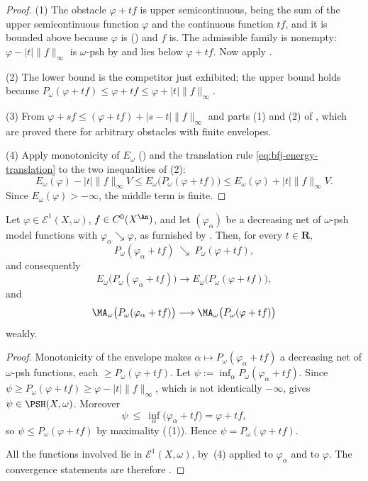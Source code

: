 \begin{proof}
(1) The obstacle \(\varphi+tf\) is upper semicontinuous, being the sum of the
upper semicontinuous function \(\varphi\) and the continuous function
\(tf\), and it is bounded above because \(\varphi\) is
() and \(f\) is.  The admissible family is nonempty:
\(\varphi-|t|\lVert f\rVert_\infty\) is \(\omega\)-psh by
 and lies below \(\varphi+tf\).  Now
apply .

(2) The lower bound is the competitor just exhibited; the upper bound holds
because \(P_\omega(\varphi+tf)\leq\varphi+tf\leq\varphi+|t|\lVert
f\rVert_\infty\).

(3) From \(\varphi+sf\leq(\varphi+tf)+|s-t|\lVert f\rVert_\infty\) and parts
(1) and (2) of , which are proved
there for arbitrary obstacles with finite envelopes.

(4) Apply monotonicity of \(E_\omega\) () and
the translation rule \eqref{eq:bfj-energy-translation} to the two
inequalities of (2):
\[
 E_\omega(\varphi)-|t|\lVert f\rVert_\infty V
 \leq E_\omega\bigl(P_\omega(\varphi+tf)\bigr)
 \leq E_\omega(\varphi)+|t|\lVert f\rVert_\infty V .
\]
Since \(E_\omega(\varphi)>-\infty\), the middle term is finite.
\end{proof}

\begin{lemma}
\label{lem:ch27-e1-envelope-approximation}
Let \(\varphi\in\mathcal E^1(X,\omega)\), \(f\in C^0(X^{\An})\), and let
\((\varphi_\alpha)\) be a decreasing net of \(\omega\)-psh model functions
with \(\varphi_\alpha\searrow\varphi\), as furnished by
.  Then, for every \(t\in\mathbf R\),
\[
 P_\omega(\varphi_\alpha+tf)\ \searrow\ P_\omega(\varphi+tf),
\]
and consequently
\[
 E_\omega\bigl(P_\omega(\varphi_\alpha+tf)\bigr)
 \longrightarrow E_\omega\bigl(P_\omega(\varphi+tf)\bigr),
\]
and
\[
 \MA_\omega\bigl(P_\omega(\varphi_\alpha+tf)\bigr)
 \longrightarrow
 \MA_\omega\bigl(P_\omega(\varphi+tf)\bigr)
\]
weakly.
\end{lemma}

\begin{proof}
Monotonicity of the envelope makes
\(\alpha\mapsto P_\omega(\varphi_\alpha+tf)\) a decreasing net of
\(\omega\)-psh functions, each \(\geq P_\omega(\varphi+tf)\).  Let
\(\psi:=\inf_\alpha P_\omega(\varphi_\alpha+tf)\).  Since
\(\psi\geq P_\omega(\varphi+tf)\geq\varphi-|t|\lVert f\rVert_\infty\), which
is not identically \(-\infty\),  gives
\(\psi\in\PSH(X,\omega)\).  Moreover
\[
 \psi\ \leq\ \inf_\alpha\bigl(\varphi_\alpha+tf\bigr)=\varphi+tf ,
\]
so \(\psi\leq P_\omega(\varphi+tf)\) by maximality
(\,(1)).  Hence
\(\psi=P_\omega(\varphi+tf)\).

All the functions involved lie in \(\mathcal E^1(X,\omega)\), by
\,(4) applied to \(\varphi_\alpha\) and
to \(\varphi\).  The convergence statements are therefore
.
\end{proof}

